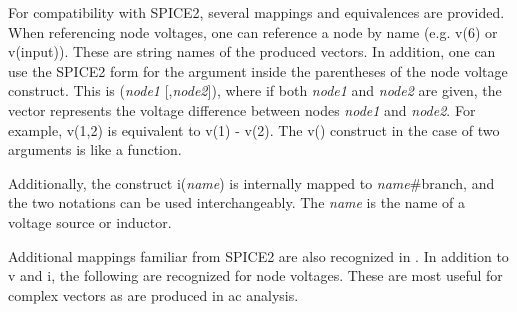 For compatibility with SPICE2, several mappings and equivalences are
provided.  When referencing node voltages, one can reference a node by
name (e.g.  {\vt v(6)} or {\vt v(input)}).  These are string names of
the produced vectors.  In addition, one can use the SPICE2 form for
the argument inside the parentheses of the node voltage construct. 
This is {\vt (}{\it node1} [{\vt ,}{\it node2\/}]{\vt )}, where if
both {\it node1} and {\it node2} are given, the vector represents the
voltage difference between nodes {\it node1} and {\it node2}.  For
example, {\vt v(1,2)} is equivalent to {\vt v(1) - v(2)}.  The {\vt
v()} construct in the case of two arguments is like a function.

Additionally, the construct {\vt i({\it name\/})} is internally mapped
to {\it name\/}{\vt \#branch}, and the two notations can be used
interchangeably.  The {\it name} is the name of a voltage source or
inductor.

Additional mappings familiar from SPICE2 are also recognized in
{\WRspice}.  In addition to {\vt v} and {\vt i}, the following are
recognized for node voltages.  These are most useful for complex
vectors as are produced in ac analysis.

